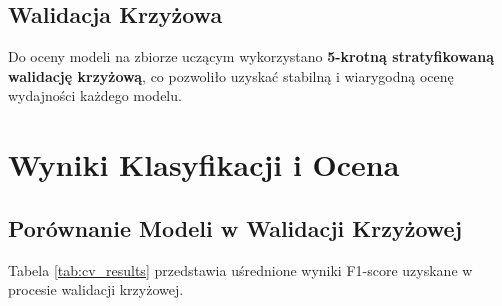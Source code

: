 \documentclass[12pt,a4paper]{article}
\begin{document}
\subsection{Walidacja Krzyżowa}
Do oceny modeli na zbiorze uczącym wykorzystano \textbf{5-krotną stratyfikowaną walidację krzyżową}, co pozwoliło uzyskać stabilną i wiarygodną ocenę wydajności każdego modelu.

\section{Wyniki Klasyfikacji i Ocena}
\subsection{Porównanie Modeli w Walidacji Krzyżowej}
Tabela \ref{tab:cv_results} przedstawia uśrednione wyniki F1-score uzyskane w procesie walidacji krzyżowej.
\end{document}
